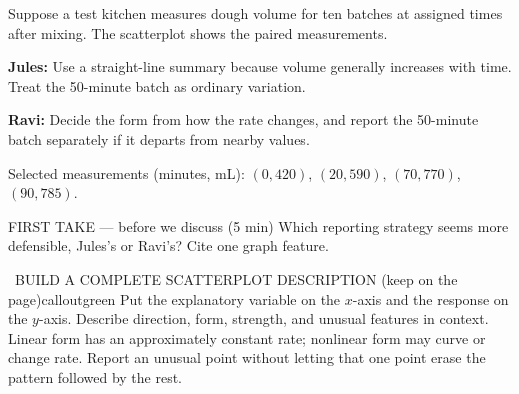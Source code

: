 \documentclass[11pt]{article}
\begin{document}


Suppose a test kitchen measures dough volume for ten batches at assigned times after mixing. The scatterplot shows the paired measurements.\par\smallskip \textbf{Jules:} Use a straight-line summary because volume generally increases with time. Treat the 50-minute batch as ordinary variation.\par \textbf{Ravi:} Decide the form from how the rate changes, and report the 50-minute batch separately if it departs from nearby values.\par Selected measurements (minutes, mL): $(0,420)$, $(20,590)$, $(70,770)$, $(90,785)$.\par
\begin{center}
\end{center}
\begin{firsttakebox}{FIRST TAKE --- before we discuss (5 min)}
Which reporting strategy seems more defensible, Jules's or Ravi's? Cite one graph feature.
\workspace{0.85in}
\end{firsttakebox}

\begin{callout}{\IconBook\ BUILD A COMPLETE SCATTERPLOT DESCRIPTION (keep on the page)}{calloutgreen}
Put the explanatory variable on the $x$-axis and the response on the $y$-axis.
Describe direction, form, strength, and unusual features in context. Linear form has
an approximately constant rate; nonlinear form may curve or change rate. Report an
unusual point without letting that one point erase the pattern followed by the rest.
\end{callout}
\end{document}
